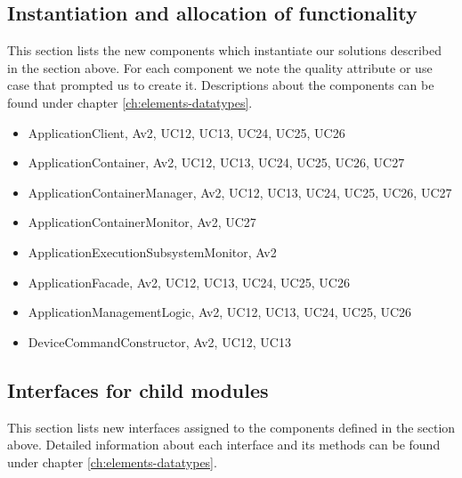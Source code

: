 
\subsection*{Instantiation and allocation of functionality}
    This section lists the new components which instantiate our solutions
    described in the section above. For each component we note the quality
    attribute or use case that prompted us to create it. Descriptions about
    the components can be found under chapter \ref{ch:elements-datatypes}. \\

    \begin{itemize}
        \item ApplicationClient, Av2, UC12, UC13, UC24, UC25, UC26
        \item ApplicationContainer, Av2, UC12, UC13, UC24, UC25, UC26, UC27
        \item ApplicationContainerManager, Av2, UC12, UC13, UC24, UC25, UC26, UC27
        \item ApplicationContainerMonitor, Av2, UC27
        \item ApplicationExecutionSubsystemMonitor, Av2
        \item ApplicationFacade, Av2, UC12, UC13, UC24, UC25, UC26
        \item ApplicationManagementLogic, Av2, UC12, UC13, UC24, UC25, UC26
        \item DeviceCommandConstructor, Av2, UC12, UC13
    \end{itemize}

\subsection*{Interfaces for child modules}
    This section lists new interfaces assigned to the components defined
    in the section above. Detailed information about each interface and
    its methods can be found under chapter \ref{ch:elements-datatypes}.


